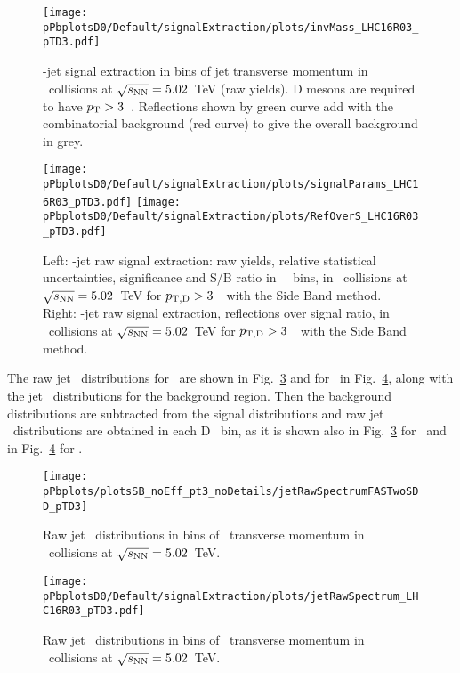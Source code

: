 \begin{figure}[bth]
\centering
\texttt{[image: pPbplotsD0/Default/signalExtraction/plots/invMass\_LHC16R03\_pTD3.pdf]}
\caption{\Dzero-jet signal extraction in bins of jet transverse momentum in \pPb\ collisions at $\sqrt{s_{\rm NN}}=5.02$~TeV (raw yields). D mesons are required to have $p_{\rm T}>3$~\GeVc. 
Reflections shown by green curve add with the combinatorial background (red curve) to give the overall background in grey.
}
\label{fig:eq_pPb_InvMass_Dzero_Dbins}
\end{figure}

\begin{figure}[bth]
\centering
\texttt{[image: pPbplotsD0/Default/signalExtraction/plots/signalParams\_LHC16R03\_pTD3.pdf]}
\texttt{[image: pPbplotsD0/Default/signalExtraction/plots/RefOverS\_LHC16R03\_pTD3.pdf]}
\caption{Left: \Dzero-jet raw signal extraction: raw yields, relative statistical uncertainties, significance and S/B ratio in \Dzero\ \pt\ bins, in \pPb\ collisions at $\sqrt{s_{\rm NN}}=5.02$~TeV for $p_{\mathrm{T,D}}>3$~\GeVc\ with the Side Band method.
\\Right: \Dzero-jet raw signal extraction, reflections over signal ratio, in \pPb\ collisions at $\sqrt{s_{\rm NN}}=5.02$~TeV for $p_{\mathrm{T,D}}>3$~\GeVc\ with the Side Band method.}
\label{fig:eq_pPb_RSU_raw_Dbins_Dzero}
\end{figure}

The raw jet \pt\ distributions for \Dstar\ are shown in Fig.~\ref{fig:eq_pPb_signBkgJet_Dstar_Dbins} and for \Dzero\ in Fig.~\ref{fig:eq_pPb_signBkgJet_Dzero_Dbins}, along with the jet \pt\ distributions for the background region. 
Then the background distributions are subtracted from the signal distributions and raw jet \pt\ distributions are obtained in each D \pt\ bin, 
as it is shown also in Fig.~\ref{fig:eq_pPb_signBkgJet_Dstar_Dbins} for \Dstar\ and in Fig.~\ref{fig:eq_pPb_signBkgJet_Dzero_Dbins} for \Dzero.
\begin{figure}[bth]
\centering
\texttt{[image: pPbplots/plotsSB\_noEff\_pt3\_noDetails/jetRawSpectrumFASTwoSDD\_pTD3]}
\caption{Raw jet \pt\ distributions in bins of \Dstar\ transverse momentum in \pPb\ collisions at $\sqrt{s_{\rm NN}}=5.02$~TeV.}
\label{fig:eq_pPb_signBkgJet_Dstar_Dbins}
\end{figure}
\begin{figure}[bth]
\centering
\texttt{[image: pPbplotsD0/Default/signalExtraction/plots/jetRawSpectrum\_LHC16R03\_pTD3.pdf]}
\caption{Raw jet \pt\ distributions in bins of \Dzero\ transverse momentum in \pPb\ collisions at $\sqrt{s_{\rm NN}}=5.02$~TeV.}
\label{fig:eq_pPb_signBkgJet_Dzero_Dbins}
\end{figure}

